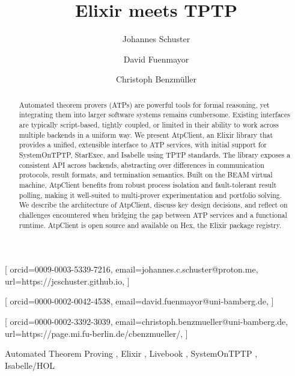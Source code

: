 \documentclass[]{ceurart}
\begin{document}


\title{Elixir meets TPTP}

\author[1]{Johannes Schuster}[%
orcid=0009-0003-5339-7216,
email=johannes.c.schuster@proton.me,
url=https://jcschuster.github.io,
]
\address[1]{University of Bamberg, Kapuzinerstraße 16, 96047 Bamberg, Germany}

\author[1]{David Fuenmayor}[%
orcid=0000-0002-0042-4538,
email=david.fuenmayor@uni-bamberg.de,
]

\author[1,2]{Christoph Benzmüller}[%
orcid=0000-0002-3392-3039,
email=christoph.benzmueller@uni-bamberg.de,
url=https://page.mi.fu-berlin.de/cbenzmueller/,
]
\cormark[1]
\address[2]{Freie Universität Berlin, Keiserswerther Str. 16-18, 14195 Berlin, Germany}


\begin{abstract}
    Automated theorem provers (ATPs) are powerful tools for formal reasoning, yet integrating them into larger software systems remains cumbersome. Existing interfaces are typically script-based, tightly coupled, or limited in their ability to work across multiple backends in a uniform way. We present AtpClient, an Elixir library that provides a unified, extensible interface to ATP services, with initial support for SystemOnTPTP, StarExec, and Isabelle using TPTP standards. The library exposes a consistent API across backends, abstracting over differences in communication protocols, result formats, and termination semantics. Built on the BEAM virtual machine, AtpClient benefits from robust process isolation and fault-tolerant result polling, making it well-suited to multi-prover experimentation and portfolio solving. We describe the architecture of AtpClient, discuss key design decisions, and reflect on challenges encountered when bridging the gap between ATP services and a functional runtime. AtpClient is open source and available on Hex, the Elixir package registry.
\end{abstract}

\begin{keywords}
  Automated Theorem Proving \sep
  Elixir \sep
  Livebook \sep
  SystemOnTPTP \sep
  Isabelle/HOL
\end{keywords}
\end{document}
